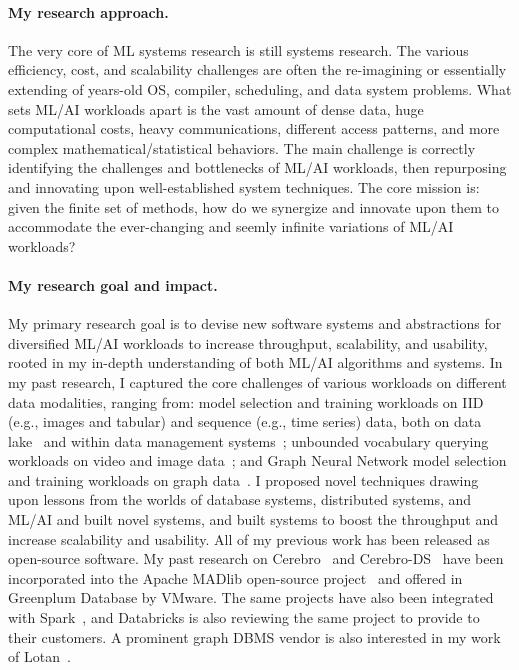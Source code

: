 \documentclass[letterpaper]{article}
\begin{document}
\paragraph{My research approach.} The very core of ML systems research is still systems research. The various efficiency, cost, and scalability challenges are often the re-imagining or essentially extending of years-old OS, compiler, scheduling, and data system problems. What sets ML/AI workloads apart is the vast amount of dense data, huge computational costs, heavy communications, different access patterns, and more complex mathematical/statistical behaviors. The main challenge is correctly identifying the challenges and bottlenecks of ML/AI workloads, then repurposing and innovating upon well-established system techniques. The core mission is: given the finite set of methods, how do we synergize and innovate upon them to accommodate the ever-changing and seemly infinite variations of ML/AI workloads? 

\paragraph{My research goal and impact.} My primary research goal is to devise new software systems and abstractions for diversified ML/AI workloads to increase throughput, scalability, and usability, rooted in my in-depth understanding of both ML/AI algorithms and systems. In my past research, I captured the core challenges of various workloads on different data modalities, ranging from: model selection and training workloads on IID (e.g., images and tabular) and sequence (e.g., time series) data, both on data lake~\cite{cerebro, cerebrodeem} and within data management systems~\cite{cerebro-ds}; unbounded vocabulary querying workloads on video and image data~\cite{panorama}; and Graph Neural Network model selection and training workloads on graph data~\cite{lotan}. I proposed novel techniques drawing upon lessons from the worlds of database systems, distributed systems, and ML/AI and built novel systems, and built systems to boost the throughput and increase scalability and usability. All of my previous work has been released as open-source software. My past research on Cerebro~\cite{cerebro, cerebrodeem} and Cerebro-DS~\cite{cerebro-ds} have been incorporated into the Apache MADlib open-source project~\cite{madlibmop} and offered in Greenplum Database by VMware. The same projects have also been integrated with Spark~\cite{sparkmop}, and Databricks is also reviewing the same project to provide to their customers. A prominent graph DBMS vendor is also interested in my work of Lotan~\cite{lotan}.
\end{document}
